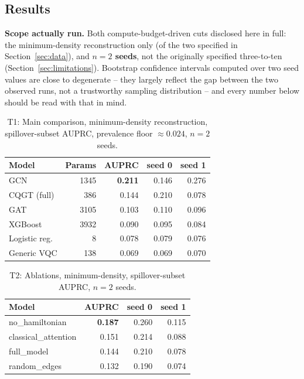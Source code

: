 \documentclass[journal]{IEEEtran}
\begin{document}
\subsection{Results}
\label{sec:results}

\textbf{Scope actually run.} Both compute-budget-driven cuts disclosed
here in full: the minimum-density reconstruction only (of the two
specified in Section~\ref{sec:data}), and \textbf{$n=2$ seeds}, not the
originally specified three-to-ten (Section~\ref{sec:limitations}).
Bootstrap confidence intervals computed over two seed values are close to
degenerate -- they largely reflect the gap between the two observed runs,
not a trustworthy sampling distribution -- and every number below should
be read with that in mind.

\begin{table}[t]
  \centering
  \caption{T1: Main comparison, minimum-density reconstruction, spillover-subset AUPRC, prevalence floor $\approx 0.024$, $n=2$ seeds.}
  \label{tab:t1}
  \begin{tabular}{lrrrr}
    \toprule
    Model & Params & AUPRC & seed 0 & seed 1 \\
    \midrule
    GCN            & 1345 & \textbf{0.211} & 0.146 & 0.276 \\
    CQGT (full)    &  386 & 0.144          & 0.210 & 0.078 \\
    GAT            & 3105 & 0.103          & 0.110 & 0.096 \\
    XGBoost        & 3932 & 0.090          & 0.095 & 0.084 \\
    Logistic reg.  &    8 & 0.078          & 0.079 & 0.076 \\
    Generic VQC    &  138 & 0.069          & 0.069 & 0.070 \\
    \bottomrule
  \end{tabular}
\end{table}

\begin{table}[t]
  \centering
  \caption{T2: Ablations, minimum-density, spillover-subset AUPRC, $n=2$ seeds.}
  \label{tab:t2}
  \begin{tabular}{lrrr}
    \toprule
    Model & AUPRC & seed 0 & seed 1 \\
    \midrule
    no\_hamiltonian       & \textbf{0.187} & 0.260 & 0.115 \\
    classical\_attention  & 0.151          & 0.214 & 0.088 \\
    full\_model           & 0.144          & 0.210 & 0.078 \\
    random\_edges         & 0.132          & 0.190 & 0.074 \\
    \bottomrule
  \end{tabular}
\end{table}
\end{document}
